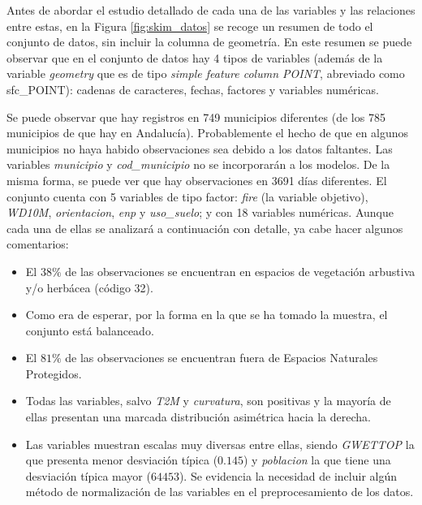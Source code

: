 \documentclass[12pt,a4paper,]{book}
\providecommand{\tightlist}{%
  \setlength{\itemsep}{0pt}\setlength{\parskip}{0pt}}
\numberwithin{dummy}{section}
\theoremstyle{ocrenumbox}
\theoremstyle{blacknumex}
\theoremstyle{blacknumbox}
\theoremstyle{ocrenum}
\theoremstyle{ocrenum}
\begin{document}
Antes de abordar el estudio detallado de cada una de las variables y las
relaciones entre estas, en la Figura \ref{fig:skim_datos} se recoge un
resumen de todo el conjunto de datos, sin incluir la columna de
geometría. En este resumen se puede observar que en el conjunto de datos
hay 4 tipos de variables (además de la variable \emph{geometry} que es
de tipo \emph{simple feature column POINT}, abreviado como sfc\_POINT):
cadenas de caracteres, fechas, factores y variables numéricas.

Se puede observar que hay registros en 749 municipios diferentes (de los
785 municipios de que hay en Andalucía). Probablemente el hecho de que
en algunos municipios no haya habido observaciones sea debido a los
datos faltantes. Las variables \emph{municipio} y \emph{cod\_municipio}
no se incorporarán a los modelos. De la misma forma, se puede ver que
hay observaciones en 3691 días diferentes. El conjunto cuenta con 5
variables de tipo factor: \emph{fire} (la variable objetivo),
\emph{WD10M}, \emph{orientacion}, \emph{enp} y \emph{uso\_suelo}; y con
18 variables numéricas. Aunque cada una de ellas se analizará a
continuación con detalle, ya cabe hacer algunos comentarios:

\begin{itemize}
\tightlist
\item
  El \(38\%\) de las observaciones se encuentran en espacios de
  vegetación arbustiva y/o herbácea (código 32).
\item
  Como era de esperar, por la forma en la que se ha tomado la muestra,
  el conjunto está balanceado.
\item
  El \(81\%\) de las observaciones se encuentran fuera de Espacios
  Naturales Protegidos.
\item
  Todas las variables, salvo \emph{T2M} y \emph{curvatura}, son
  positivas y la mayoría de ellas presentan una marcada distribución
  asimétrica hacia la derecha.
\item
  Las variables muestran escalas muy diversas entre ellas, siendo
  \emph{GWETTOP} la que presenta menor desviación típica (\(0.145\)) y
  \emph{poblacion} la que tiene una desviación típica mayor (\(64453\)).
  Se evidencia la necesidad de incluir algún método de normalización de
  las variables en el preprocesamiento de los datos.
\end{itemize}
\end{document}

